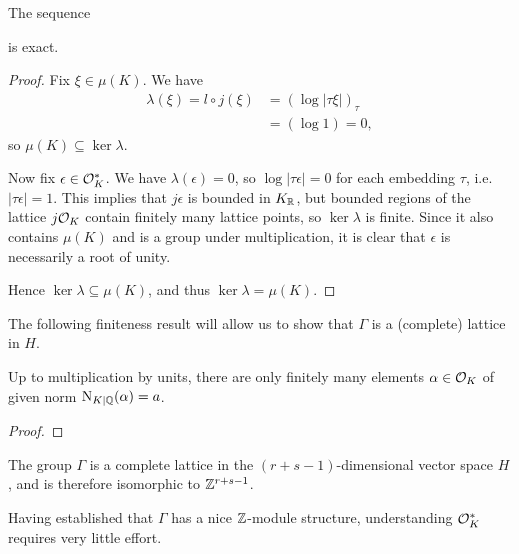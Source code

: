 \begin{prop}
The sequence
\begin{center}
\end{center}
is exact.
\end{prop}
\begin{proof}
	Fix $\xi\in\mu(K)$. We have
	\begin{align*}
		\lambda(\xi) = l\circ j(\xi) &= \left(\log|\tau\xi|\right)_\tau\\
			&= (\log 1) = 0,
	\end{align*}
	so $\mu(K)\subseteq\ker\lambda$.

	Now fix $\epsilon\in\mathcal{O}^*_K$. We have $\lambda(\epsilon)=0$, so $\log|\tau\epsilon|=0$ for each embedding $\tau$, i.e. $|\tau\epsilon|=1$. This implies that $j\epsilon$ is bounded in $K_{\mathbb{R}}$, but bounded regions of the lattice $j\mathcal{O}_K$ contain finitely many lattice points, so $\ker\lambda$ is finite. Since it also contains $\mu(K)$ and is a group under multiplication, it is clear that $\epsilon$ is necessarily a root of unity.

	Hence $\ker\lambda\subseteq\mu(K)$, and thus $\ker\lambda=\mu(K)$.
\end{proof}

The following finiteness result will allow us to show that $\Gamma$ is a (complete) lattice in $H$.

\begin{lem}
	Up to multiplication by units, there are only finitely many elements $\alpha\in\mathcal{O}_K$ of given norm $\operatorname{N}_{K\mid\mathbb{Q}}(\alpha)=a$.
\end{lem}
\begin{proof}
\end{proof}

\begin{thm}
	The group $\Gamma$ is a complete lattice in the $(r+s-1)$-dimensional vector space $H$, and is therefore isomorphic to $\mathbb{Z}^{r+s-1}$.
\end{thm}

Having established that $\Gamma$ has a nice $\mathbb{Z}$-module structure, understanding $\mathcal{O}^*_K$ requires very little effort.

